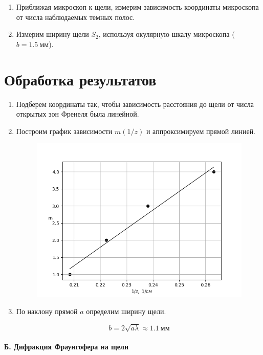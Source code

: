 \documentclass[14pt, a4paper]{report}
\begin{document}
\begin{enumerate}
\item Приближая микроскоп к щели, измерим зависимость координаты микроскопа от числа наблюдаемых темных полос.

\item Измерим ширину щели $S_2$, используя окулярную шкалу микроскопа ($b=1.5\ мм$).

\end{enumerate}

\section{Обработка результатов}

\begin{enumerate}

\item Подберем координаты так, чтобы зависимость расстояния до щели от числа открытых зон Френеля была линейной.

\item Построим график зависимости $m(1/z)$ и аппроксимируем прямой линией.

\begin{figure}[H]
\centering
\includegraphics[scale=0.6]{../images/431m_6}
\end{figure}

\item По наклону прямой $a$ определим ширину щели.

\[b=2\sqrt{a\lambda}\approx1.1\ мм\]

\end{enumerate}

\paragraph*{Б. Дифракция Фраунгофера на щели}
\end{document}
